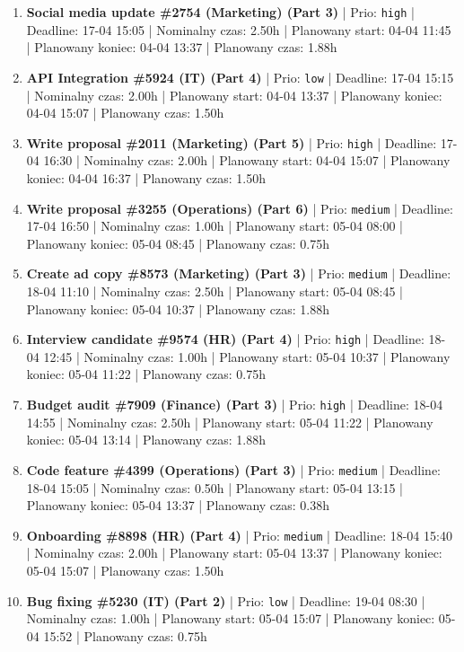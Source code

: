 {\begin{enumerate}
  \item [\textbf{14611}] \textbf{Social media update \#2754 (Marketing) (Part 3)} | Prio: \texttt{high} | Deadline: 17-04 15:05 | Nominalny czas: 2.50h | Planowany start: 04-04 11:45 | Planowany koniec: 04-04 13:37 | Planowany czas: 1.88h
  \item [\textbf{14696}] \textbf{API Integration \#5924 (IT) (Part 4)} | Prio: \texttt{low} | Deadline: 17-04 15:15 | Nominalny czas: 2.00h | Planowany start: 04-04 13:37 | Planowany koniec: 04-04 15:07 | Planowany czas: 1.50h
  \item [\textbf{14628}] \textbf{Write proposal \#2011 (Marketing) (Part 5)} | Prio: \texttt{high} | Deadline: 17-04 16:30 | Nominalny czas: 2.00h | Planowany start: 04-04 15:07 | Planowany koniec: 04-04 16:37 | Planowany czas: 1.50h
  \item [\textbf{14654}] \textbf{Write proposal \#3255 (Operations) (Part 6)} | Prio: \texttt{medium} | Deadline: 17-04 16:50 | Nominalny czas: 1.00h | Planowany start: 05-04 08:00 | Planowany koniec: 05-04 08:45 | Planowany czas: 0.75h
  \item [\textbf{14677}] \textbf{Create ad copy \#8573 (Marketing) (Part 3)} | Prio: \texttt{medium} | Deadline: 18-04 11:10 | Nominalny czas: 2.50h | Planowany start: 05-04 08:45 | Planowany koniec: 05-04 10:37 | Planowany czas: 1.88h
  \item [\textbf{14612}] \textbf{Interview candidate \#9574 (HR) (Part 4)} | Prio: \texttt{high} | Deadline: 18-04 12:45 | Nominalny czas: 1.00h | Planowany start: 05-04 10:37 | Planowany koniec: 05-04 11:22 | Planowany czas: 0.75h
  \item [\textbf{14616}] \textbf{Budget audit \#7909 (Finance) (Part 3)} | Prio: \texttt{high} | Deadline: 18-04 14:55 | Nominalny czas: 2.50h | Planowany start: 05-04 11:22 | Planowany koniec: 05-04 13:14 | Planowany czas: 1.88h
  \item [\textbf{14664}] \textbf{Code feature \#4399 (Operations) (Part 3)} | Prio: \texttt{medium} | Deadline: 18-04 15:05 | Nominalny czas: 0.50h | Planowany start: 05-04 13:15 | Planowany koniec: 05-04 13:37 | Planowany czas: 0.38h
  \item [\textbf{14636}] \textbf{Onboarding \#8898 (HR) (Part 4)} | Prio: \texttt{medium} | Deadline: 18-04 15:40 | Nominalny czas: 2.00h | Planowany start: 05-04 13:37 | Planowany koniec: 05-04 15:07 | Planowany czas: 1.50h
  \item [\textbf{14680}] \textbf{Bug fixing \#5230 (IT) (Part 2)} | Prio: \texttt{low} | Deadline: 19-04 08:30 | Nominalny czas: 1.00h | Planowany start: 05-04 15:07 | Planowany koniec: 05-04 15:52 | Planowany czas: 0.75h

\end{enumerate}}

